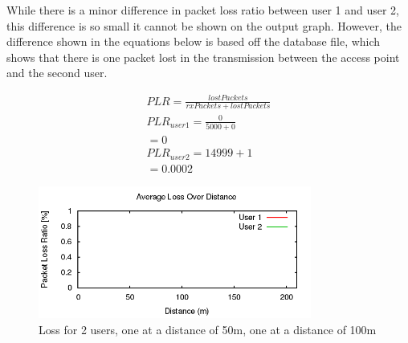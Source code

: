 While there is a minor difference in packet loss ratio between user 1 and user
2, this difference is so small it cannot be shown on the output graph. However,
the difference shown in the equations below is based off the database file,
which shows that there is one packet lost in the transmission between the access
point and the second user.

\begin{gather*}
	PLR=\frac{lostPackets}{rxPackets+lostPackets} \\
	PLR_{user 1}=\frac{0}{5000+0} \\
	= 0 \\
	PLR_{user 2}={1}{4999+1} \\
	= 0.0002
\end{gather*}

\begin{figure}[H]
	\centering
	\includegraphics[width=0.8\textwidth]{images/EE500/QC/P1/Images/wifi-loss}
	\caption{Loss for 2 users, one at a distance of 50m, one at a distance
	of 100m}
	\label{fig:QCP1loss}
\end{figure}
